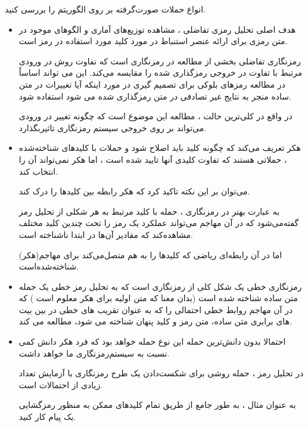 \begin{boxK}
انواع حملات صورت‌گرفته بر روی الگوریتم
را بررسی کنید.
\end{boxK}

\begin{boxL}
\begin{itemize}
    \item 
    \newline
    هدف اصلی تحلیل رمزی تفاضلی ، مشاهده 
    توزیع‌های آماری و الگوهای موجود در متن رمزی برای ارائه عنصر استنباط در مورد کلید مورد استفاده در رمز است.

    رمزنگاری تفاضلی بخشی از مطالعه در رمزنگاری است که تفاوت روش در ورودی مرتبط با تفاوت در خروجی رمزگذاری شده را مقایسه می‌کند. این می تواند اساساً در مطالعه رمزهای بلوکی برای تصمیم گیری در مورد اینکه آیا تغییرات در متن ساده منجر به نتایج غیر تصادفی در متن رمزگذاری شده می شود استفاده شود.

    در واقع در کلی‌ترین حالت ، مطالعه این موضوع است که چگونه تغییر در ورودی می‌تواند بر روی خروجی سیستم رمزنگاری تاثیربگذارد.
    
    \item 
        \newline
        هکر تعریف می‌کند که چگونه کلید باید اصلاح شود و حملات با کلیدهای شناخته‌شده ، حملاتی هستند که 
        تفاوت کلیدی آنها تایید شده است ، اما هکر نمی‌تواند آن را انتخاب کند.

        می‌توان بر این نکته تاکید کرد که هکر رابطه بین کلیدها را درک کند.

        به عبارت بهتر در رمزنگاری ، حمله با کلید مرتبط به هر شکلی از تحلیل رمز گفته‌می‌شود که در آن مهاجم می‌تواند عملکرد یک رمز را تحت چندین کلید مختلف مشاهده‌کند که مقادیر آن‌ها در ابتدا ناشناخته است.

        اما در آن رابطه‌ای ریاضی که کلیدها را به هم متصل‌می‌کند برای مهاجم(هکر)
        شناخته‌شده‌است.

    \item 
        \newline
        رمزنگاری خطی یک شکل کلی از رمزنگاری است که به تحلیل رمز خطی یک حمله متن ساده شناخته شده است 
        (بدان معنا که متن اولیه برای  هکر معلوم است )
        که در آن مهاجم روابط خطی احتمالی را که به عنوان تقریب های خطی در بین بیت های برابری متن ساده، متن رمز و کلید پنهان شناخته می شود، مطالعه می کند.


    \item 
        \newline
        احتمالا بدون دانش‌ترین حمله این نوع حمله خواهد بود که فرد هکر دانش کمی نسبت به سیستم‌رمزنگاری ما خواهد داشت.

        در تحلیل رمز ،
        حمله
        روشی برای شکست‌دادن یک طرح رمزنگاری با آزمایش تعداد زیادی از احتمالات است.

        به عنوان مثال ، به طور جامع از طریق تمام کلیدهای ممکن به منظور رمزگشایی یک پیام کار کنید.


    
\end{itemize}
\end{boxL}

